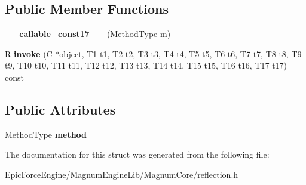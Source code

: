 \subsection*{Public Member Functions}
\begin{DoxyCompactItemize}
\item 
{\bfseries \+\_\+\+\_\+callable\+\_\+const17\+\_\+\+\_\+} (Method\+Type m)\hypertarget{structagm_1_1reflection_1_1____callable__const17_____af34e552ab7ad505cc5b599065dbaa45a}{}\label{structagm_1_1reflection_1_1____callable__const17_____af34e552ab7ad505cc5b599065dbaa45a}

\item 
R {\bfseries invoke} (C $\ast$object, T1 t1, T2 t2, T3 t3, T4 t4, T5 t5, T6 t6, T7 t7, T8 t8, T9 t9, T10 t10, T11 t11, T12 t12, T13 t13, T14 t14, T15 t15, T16 t16, T17 t17) const \hypertarget{structagm_1_1reflection_1_1____callable__const17_____a05d5a9eaf5b386788277366a096aecac}{}\label{structagm_1_1reflection_1_1____callable__const17_____a05d5a9eaf5b386788277366a096aecac}

\end{DoxyCompactItemize}
\subsection*{Public Attributes}
\begin{DoxyCompactItemize}
\item 
Method\+Type {\bfseries method}\hypertarget{structagm_1_1reflection_1_1____callable__const17_____ad5f15fc7da5ca80da51351a6be39e536}{}\label{structagm_1_1reflection_1_1____callable__const17_____ad5f15fc7da5ca80da51351a6be39e536}

\end{DoxyCompactItemize}


The documentation for this struct was generated from the following file\+:\begin{DoxyCompactItemize}
\item 
Epic\+Force\+Engine/\+Magnum\+Engine\+Lib/\+Magnum\+Core/reflection.\+h\end{DoxyCompactItemize}
